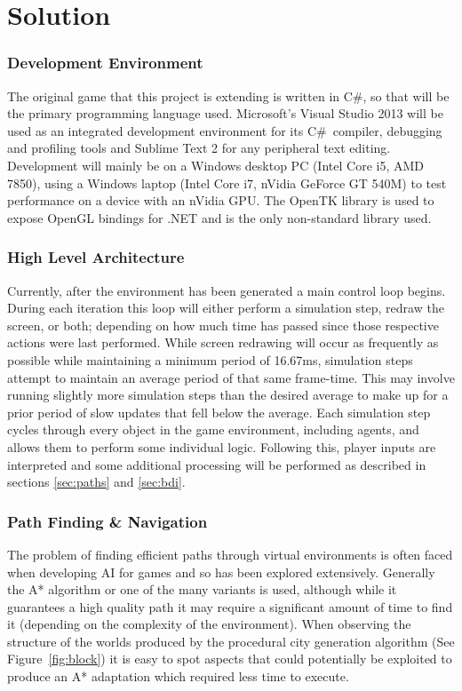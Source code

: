\documentclass[12pt,a4paper]{article}
\newcommand{\Csh}{C{\lserif\#}}
\begin{document}
\section{Solution}

\subsubsection{Development Environment}\noindent
The original game that this project is extending is written in \Csh, so that will be the primary programming language used. Microsoft's Visual Studio 2013 will be used as an integrated development environment for its \Csh~compiler, debugging and profiling tools and Sublime Text 2 for any peripheral text editing. Development will mainly be on a Windows desktop PC (Intel Core i5, AMD 7850), using a Windows laptop (Intel Core i7, nVidia GeForce GT 540M) to test performance on a device with an nVidia GPU. The OpenTK library is used to expose OpenGL bindings for .NET and is the only non-standard library used.

\subsubsection{High Level Architecture}\noindent
Currently, after the environment has been generated a main control loop begins. During each iteration this loop will either perform a simulation step, redraw the screen, or both; depending on how much time has passed since those respective actions were last performed. While screen redrawing will occur as frequently as possible while maintaining a minimum period of 16.67ms, simulation steps attempt to maintain an average period of that same frame-time. This may involve running slightly more simulation steps than the desired average to make up for a prior period of slow updates that fell below the average. Each simulation step cycles through every object in the game environment, including agents, and allows them to perform some individual logic. Following this, player inputs are interpreted and some additional processing will be performed as described in sections \ref{sec:paths} and \ref{sec:bdi}.

\subsubsection{Path Finding \& Navigation}\noindent
The problem of finding efficient paths through virtual environments is often faced when developing AI for games and so has been explored extensively. Generally the A* algorithm \cite{bulitko10} or one of the many variants is used, although while it guarantees a high quality path it may require a significant amount of time to find it (depending on the complexity of the environment). When observing the structure of the worlds produced by the procedural city generation algorithm (See Figure~\ref{fig:block}) it is easy to spot aspects that could potentially be exploited to produce an A* adaptation which required less time to execute.
\end{document}
